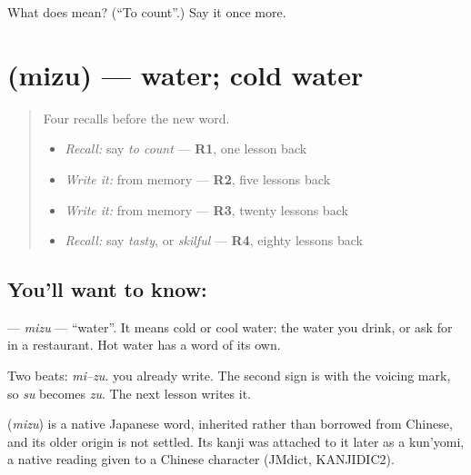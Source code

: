 \begin{tcolorbox}[breakable,colback=teal!4,colframe=teal!35!black,title={Before you move on}]
What does  mean? (\textquotedblleft{}To count\textquotedblright{}.) Say it once more.
\end{tcolorbox}
\section[\texorpdfstring{\ja{みず} (mizu)}{みず (mizu)}]{ (mizu) — water; cold water}

\label{lesson:JA-C136-mizu}



\begin{quote}
Four recalls before the new word.

\begin{itemize}
\raggedright
  \item \emph{Recall:} say \emph{to count} — \textbf{R1}, one lesson back
  \item \emph{Write it:} \textbf{} from memory — \textbf{R2}, five lessons back
  \item \emph{Write it:} \textbf{} from memory — \textbf{R3}, twenty lessons back
  \item \emph{Recall:} say \emph{tasty}, or \emph{skilful} — \textbf{R4}, eighty lessons back
\end{itemize}
\end{quote}

\subsection*{You'll want to know: }
\textbf{} — \emph{mizu} — \textquotedblleft{}water\textquotedblright{}. It means cold or cool water: the water you drink, or ask for in a restaurant. Hot water has a word of its own.

Two beats: \emph{mi–zu}. \textbf{} you already write. The second sign is \textbf{} with the voicing mark, so \emph{su} becomes \emph{zu}. The next lesson writes it.

\begin{cousinweb}
\textbf{} (\emph{mizu}) is a native Japanese word, inherited rather than borrowed from Chinese, and its older origin is not settled. Its kanji was attached to it later as a kun'yomi, a native reading given to a Chinese character (JMdict, KANJIDIC2).
\end{cousinweb}

